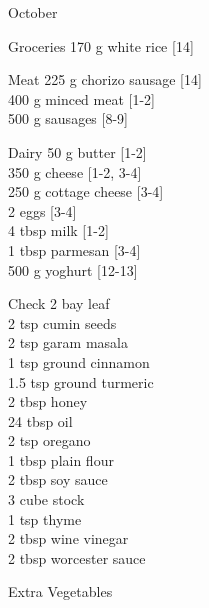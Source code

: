 \begin{menu}{October}
\begin{shoppinglist}{Groceries}
      170 g white rice {\scriptsize[14]}\\
      \end{shoppinglist}%
      \par\vfil %
      \begin{shoppinglist}{Meat}
      225 g chorizo sausage {\scriptsize[14]}\\
      400 g minced meat {\scriptsize[1-2]}\\
      500 g sausages {\scriptsize[8-9]}\\
      \end{shoppinglist}%
      \begin{shoppinglist}{Dairy}
      50 g butter {\scriptsize[1-2]}\\
      350 g cheese {\scriptsize[1-2, 3-4]}\\
      250 g cottage cheese {\scriptsize[3-4]}\\
      2  eggs {\scriptsize[3-4]}\\
      4 tbsp milk {\scriptsize[1-2]}\\
      1 tbsp parmesan {\scriptsize[3-4]}\\
      500 g yoghurt {\scriptsize[12-13]}\\
      \end{shoppinglist}%
      \par\vfil %
      \vfil\clearpage %
      \begin{shoppinglist}{Check}
      2  bay leaf \\
      2 tsp cumin seeds \\
      2 tsp garam masala \\
      1 tsp ground cinnamon \\
      1.5 tsp ground turmeric \\
      2 tbsp honey \\
      24 tbsp oil \\
      2 tsp oregano \\
      1 tbsp plain flour \\
      2 tbsp soy sauce \\
      3 cube stock \\
      1 tsp thyme \\
      2 tbsp wine vinegar \\
      2 tbsp worcester sauce \\
      \end{shoppinglist}%
      \begin{shoppinglist}{Extra Vegetables}

\end{shoppinglist}
\end{menu}
